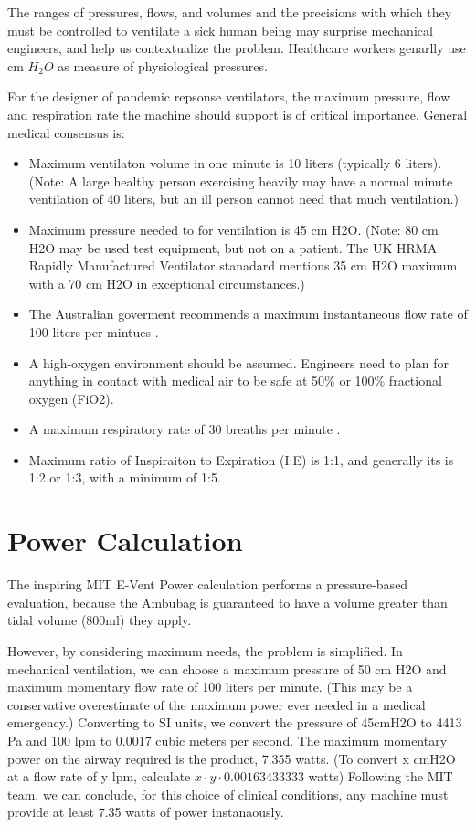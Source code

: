 \documentclass[conference]{article}
\begin{document}
The ranges of pressures, flows, and volumes and the precisions with which
they must be controlled to ventilate a sick human being may surprise
mechanical engineers, and help us contextualize the problem.
Healthcare workers genarlly use cm $H_2O$ as measure of physiological
pressures.

For the designer of pandemic repsonse ventilators, the maximum pressure,
flow and respiration rate the machine should support is of critical importance.
General medical consensus is:
\begin{itemize}
\item Maximum ventilaton volume in one minute is 10 liters (typically 6 liters).
  (Note: A large healthy person exercising heavily may have a normal minute ventilation of 40 liters, but an ill person cannot need that much ventilation.)
\item Maximum pressure needed to for ventilation is 45 cm H2O\cite{de2012large,bein2016standard,australiarequirement}.
  (Note: 80 cm H2O may be used test equipment, but not on a patient.
  The UK HRMA Rapidly Manufactured Ventilator stanadard mentions 35 cm H2O maximum with a 70 cm H2O in exceptional circumstances\cite{rmvs}.)
\item The Australian goverment recommends a maximum instantaneous flow rate of 100 liters per mintues \cite{australiarequirement}.
\item A high-oxygen environment should be assumed. Engineers need to plan for anything
  in contact with medical air to be safe at 50\% or 100\% fractional oxygen (FiO2).
\item A maximum respiratory rate of 30 breaths per minute \cite{rmvs}.
  \item Maximum ratio of Inspiraiton to Expiration (I:E) is 1:1, and generally its is 1:2 or 1:3, with a minimum of 1:5.
  \end{itemize}



\section{Power Calculation}

The inspiring MIT E-Vent Power calculation\cite{mitpowercalculation} performs
a pressure-based evaluation, because the Ambubag is guaranteed to have a volume greater than tidal volume (800ml) they apply.

However, by considering maximum needs, the problem is simplified. In mechanical ventilation,
we can choose a maximum pressure of 50 cm H2O and maximum momentary flow rate of 100 liters per minute.
(This may be a conservative overestimate of the maximum power ever needed in a medical emergency.)
Converting to SI units, we convert the pressure of 45cmH2O to 4413 Pa and 100 lpm to 0.0017 cubic meters per second.
The maximum momentary power on the airway required is the product, 7.355 watts.
(To convert x cmH2O at a flow rate of y lpm, calculate $x \cdot y \cdot 0.00163433333$ watts)
Following the MIT team, we can conclude, for this choice of clinical conditions, any
machine must provide at least 7.35 watts of power instanaously.
\end{document}
